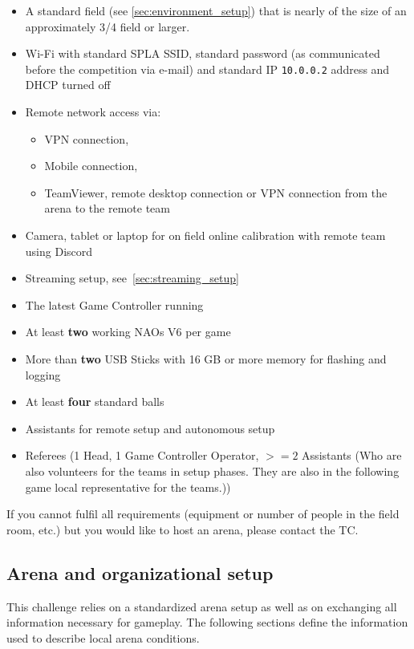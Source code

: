 \begin{itemize}
    \item A standard field (see \ref{sec:environment_setup}) that is nearly of the size of an approximately 3/4 field or larger.
	\item Wi-Fi with standard SPL\textunderscore A SSID, standard password (as communicated before the competition via e-mail) and standard IP \texttt{10.0.0.2} address and DHCP turned off
    \item Remote network access via:
    \begin{itemize}
        \item VPN connection,
        \item Mobile connection,
        \item TeamViewer, remote desktop connection or VPN connection from the arena to the remote team
    \end{itemize}
    \item Camera, tablet or laptop for on field online calibration with remote team using Discord
    \item Streaming setup, see~\ref{sec:streaming_setup}
	\item The latest Game Controller running
    \item At least \textbf{two} working NAOs V6 per game
    \item More than \textbf{two} USB Sticks with 16 GB or more memory for flashing and logging 
    \item At least \textbf{four} standard balls
    \item Assistants for remote setup and autonomous setup
    \item Referees (1 Head, 1 Game Controller Operator, $>= 2$ Assistants (Who are also volunteers for the teams in setup phases. They are also in the following game local representative for the teams.))
\end{itemize}

If you cannot fulfil all requirements (equipment or number of people in the field room, etc.) but you would like to host an arena, please contact the TC.

\subsection{Arena and organizational setup}
\label{sec:arean-org-setup}
This challenge relies on a standardized arena setup as well as on exchanging all information necessary for gameplay. The following sections define the information used to describe local arena conditions.

